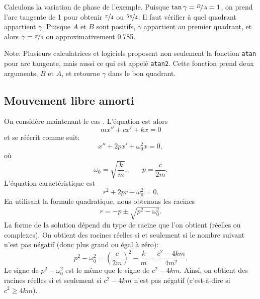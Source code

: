 Calculons la variation de phase de l'exemple.
Puisque $\tan \gamma = \nicefrac{B}{A} = 1$, on prend l'arc tangente de 1 pour obtenir 
$\nicefrac{\pi}{4}$ ou $\nicefrac{5\pi}{4}$. 
Il faut vérifier à quel quadrant appartient $\gamma$.
Puisque  $A$ et $B$ sont positifs, $\gamma$ appartient au premier quadrant, et alors $\gamma =
\nicefrac{\pi}{4}$ ou approximativement 0.785.

Note: Plusieurs calculatrices et logiciels proposent non seulement la fonction 
\texttt{atan} pour arc tangente, mais aussi ce qui est appelé  \texttt{atan2}.
Cette fonction prend deux arguments, $B$ et $A$, et retourne $\gamma$ dans le bon quadrant.



\subsection{Mouvement libre amorti}


On considère maintenant le cas .  L'équation est alors 
\begin{equation*}
	m x'' + c x' + kx = 0
\end{equation*}
et se réécrit comme suit: 
\begin{equation*}
	x'' + 2p x' + \omega_0^2 x = 0,
\end{equation*}
où
\begin{equation*}
	\omega_0 = \sqrt{\frac{k}{m}}, \qquad p = \frac{c}{2m}.
\end{equation*}
L'équation caractéristique est
\begin{equation*}
	r^2 + 2 pr + \omega_0^2 = 0 .
\end{equation*}
En utilisant la formule quadratique, nous obtenons les racines 
\begin{equation*}
	r = -p \pm \sqrt{p^2 - \omega_0^2} .
\end{equation*}
La forme de la solution dépend du type de racine que l'on obtient (réelles ou complexes). 
On obtient des racines réelles si et seulement si le nombre suivant n'est pas négatif (donc plus grand ou égal à zéro): 
\begin{equation*}
	p^2 - \omega_0^2 = {\left( \frac{c}{2m} \right)}^2 - \frac{k}{m}
					 = \frac{c^2 - 4km}{4m^2} .
\end{equation*}
Le signe de $p^2-\omega_0^2$ est le même que le signe de $c^2 - 4km$.  
Ainsi, on obtient des racines réelles si et seulement si  $c^2-4km$ n'est pas négatif (c'est-à-dire si $c^2 \geq 4km$).




